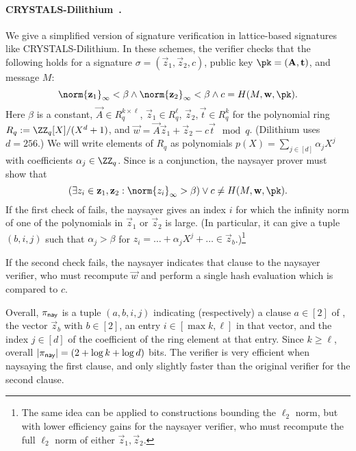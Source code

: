 \paragraph{CRYSTALS-Dilithium~\cite{TCHES:DKLLS18}.} We give a simplified version of signature verification in lattice-based signatures like CRYSTALS-Dilithium. In these schemes, the verifier checks that the following holds for a signature $\sigma=(\vec{z}_1,\vec{z}_2,c)$, public key $\pk=(\vec{A},\vec{t})$, and message $M$:
\begin{equation}\label{eq:crystals_verifier_check}
    \norm{\vec{z}_1}_\infty < \beta \land
    \norm{\vec{z}_2}_\infty < \beta \land 
    c=H(M, \vec{w}, \pk).
\end{equation}
Here $\beta$ is a constant, $\vec{A}\in R_q^{k\times \ell}$, $\vec{z}_1 \in R_q^\ell$, $\vec{z}_2,\vec{t}\in R_q^k$ for the polynomial ring $R_q:=\ZZ_q[X]/(X^d+1)$, and $\vec{w} = \vec{A}\vec{z}_1+\vec{z}_2-c\vec{t} \mod{q}$. (Dilithium uses $d=256$.) We will write elements of $R_q$ as polynomials $p(X) = \sum_{j\in[d]} \alpha_j X^j$ with coefficients $\alpha_j \in \ZZ_q$.
Since  is a conjunction, the naysayer prover must show that
\begin{equation}\label{eq:crystals_naysayer_prover}
    \left( \exists z_i \in \vec{z}_1,\vec{z}_2: \norm{z_i}_\infty > \beta \right) \lor 
    c\neq H(M, \vec{w}, \pk).
\end{equation}
If the first check of  fails, the naysayer gives an index $i$ for which the infinity norm of one of the polynomials in $\vec{z}_1$ or $\vec{z}_2$ is large. (In particular, it can give a tuple $(b,i,j)$ such that $\alpha_j > \beta$ for $z_i = \dots + \alpha_j X^j + \dots \in \vec{z}_b$.)\footnote{The same idea can be applied to constructions bounding the $\ell_2$ norm, but with lower efficiency gains for the naysayer verifier, who must recompute the full $\ell_2$ norm of either $\vec{z}_1,\vec{z}_2$.}

If the second check fails, the naysayer indicates that clause to the naysayer verifier, who must recompute $\vec{w}$ and perform a single hash evaluation which is compared to $c$.

Overall, $\pi_{\mathsf{nay}}$ is a tuple $(a, b, i, j)$ indicating (respectively) a clause $a \in [2]$ of , the vector $\vec{z}_b$ with $b \in [2]$, an entry $i \in [\max{k,\ell}]$ in that vector, and the index $j \in [d]$ of the coefficient of the ring element at that entry. Since $k \geq \ell$, overall $\lvert \pi_{\mathsf{nay}} \rvert = (2+\log{k}+\log{d})$ bits. The verifier is very efficient when naysaying the first clause, and only slightly faster than the original verifier for the second clause.

